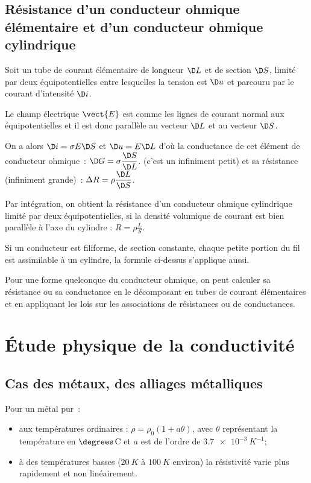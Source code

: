 \subsection{Résistance d'un conducteur ohmique élémentaire et d'un conducteur ohmique cylindrique}

Soit un tube de courant élémentaire de longueur $\D L$ et de section $\D S$, limité par deux équipotentielles entre lesquelles la tension est $\D u$ et parcouru par le courant d'intensité $\D i$. 

Le champ électrique $\vect{E}$ est comme les lignes de courant normal aux équipotentielles et il est donc parallèle au vecteur $\D L$ et au vecteur $\D S$. 

On a alors $\D i = \sigma E \D S$ et $\D u = E \D L$ d'où la conductance de cet élément de conducteur ohmique~: $\D G = \sigma \derived{S}{L}$.
 (c'est un infiniment petit) et sa résistance (infiniment grande)~: $\Delta R = \rho \derived{L}{S}$.

Par intégration, on obtient la résistance d'un conducteur ohmique cylindrique limité par deux équipotentielles, si la densité volumique de courant est bien parallèle à l'axe du cylindre : $R = \rho \frac{L}{S}$.

Si un conducteur est filiforme, de section constante, chaque petite portion du fil est assimilable à un cylindre, la formule ci-dessus s'applique aussi.

Pour une forme quelconque du conducteur ohmique, on peut calculer sa résistance ou sa conductance en le décomposant en tubes de courant élémentaires et en appliquant les lois sur les associations de résistances ou de conductances.

\section{Étude physique de la conductivité}

\subsection{Cas des métaux, des alliages métalliques}

Pour un métal pur~:
\begin{itemize}
\item aux températures ordinaires : $\rho = \rho_0 (1 + a \theta)$, avec $\theta$ représentant la température en $\degrees$C et $a$ est de l'ordre de $\SI{3,7e-3}{K^{-1}}$;
\item à des températures basses ($\SI{20}{K}$ à $\SI{100}{K}$ environ) la résistivité varie plus rapidement et non linéairement.
\end{itemize}

